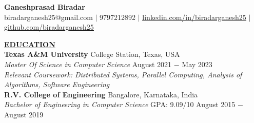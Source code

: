 \documentclass{article}
\begin{document}
\begin{center}
\large \textbf{Ganeshprasad Biradar \\}
\normalsize biradarganesh25@gmail.com $\mid$ 9797212892 $\mid$ \href{https://www.linkedin.com/in/biradarganesh25}{\underline{linkedin.com/in/biradarganesh25}} $\mid$ \href{https://github.com/biradarganesh25}{\underline{github.com/biradarganesh25}} \\
\hrulefill
\end{center}





\noindent \textbf{\underline{EDUCATION}} \\
\textbf{Texas A\&M University} \hfill College Station, Texas, USA \\
\textit{Master Of Science in Computer Science}  \hfill August 2021 $-$ May 2023 \\
\textit{Relevant Coursework: Distributed Systems, Parallel Computing, Analysis of Algorithms, Software Engineering}\\

\noindent \textbf{R.V. College of Engineering} \hfill Bangalore, Karnataka, India \\
\textit{Bachelor of Engineering in Computer Science} \hspace{1.1cm} GPA: 9.09/10 \hfill August 2015 $-$ August 2019 \\
\end{document}

